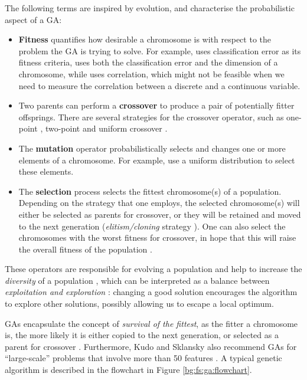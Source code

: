 \documentclass[12pt, twoside, a4paper]{report}
\begin{document}
The following terms are inspired by evolution, and characterise the probabilistic aspect of a GA:
\begin{itemize}
  \item \textbf{Fitness} quantifies how desirable a chromosome is with respect to the problem the GA is trying to solve. For example, \cite{RefWorks:204} uses classification error as its fitness criteria, \cite{RefWorks:200} uses both the classification error and the dimension of a chromosome, while \cite{RefWorks:201} uses correlation, which might not be feasible when we need to measure the correlation between a discrete and a continuous variable.
  
  \item Two parents can perform a \textbf{crossover} to produce a pair of potentially fitter offsprings. There are several strategies for the crossover operator, such as one-point \cite{RefWorks:201}, two-point \cite{RefWorks:202, RefWorks:204} and uniform crossover \cite{RefWorks:222}.
  
  \item The \textbf{mutation} operator probabilistically selects and changes one or more elements of a chromosome. For example, \cite{RefWorks:201, RefWorks:204} use a uniform distribution to select these elements.

  \item The \textbf{selection} process selects the fittest chromosome(s) of a population. Depending on the strategy that one employs, the selected chromosome(s) will either be selected as parents for crossover, or they will be retained and moved to the next generation (\textit{elitism/cloning}  strategy \cite{RefWorks:202, RefWorks:212, RefWorks:227}). One can also select the chromosomes with the worst fitness for crossover, in hope that this will raise the overall fitness of the population \cite{RefWorks:203}.
  
\end{itemize}

These operators are responsible for evolving a population and help to increase the \textit{diversity} of a population \cite{RefWorks:236}, which can be interpreted as a balance between \textit{exploitation and exploration} \cite{RefWorks:236}: changing a good solution encourages the algorithm to explore other solutions, possibly allowing us to escape a local optimum.

GAs encapsulate the concept of \textit{survival of the fittest}, as the fitter a chromosome is, the more likely it is either copied to the next generation, or selected as a parent for crossover \cite{RefWorks:209}. Furthermore, Kudo and Sklansky also recommend GAs for ``large-scale'' problems that involve more than 50 features \cite{RefWorks:210}. A typical genetic algorithm is described in the flowchart in Figure \ref{bg:fs:ga:flowchart}.
\end{document}
